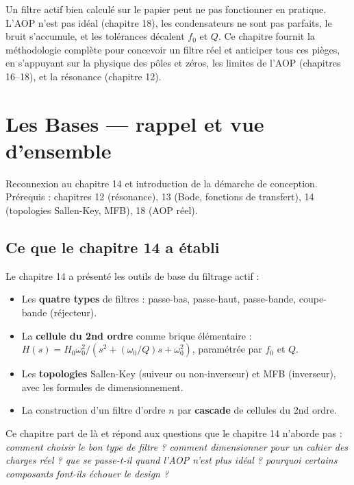 \documentclass[12pt,a4paper,twoside]{book}
\begin{document}
Un filtre actif bien calculé sur le papier peut ne pas fonctionner en pratique. L'AOP n'est pas idéal (chapitre 18), les condensateurs ne sont pas parfaits, le bruit s'accumule, et les tolérances décalent $f_0$ et $Q$. Ce chapitre fournit la méthodologie complète pour concevoir un filtre réel et anticiper tous ces pièges, en s'appuyant sur la physique des pôles et zéros, les limites de l'AOP (chapitres 16--18), et la résonance (chapitre 12).

\section{Les Bases --- rappel et vue d'ensemble}

\begin{bases}
Reconnexion au chapitre 14 et introduction de la démarche de conception. Prérequis : chapitres 12 (résonance), 13 (Bode, fonctions de transfert), 14 (topologies Sallen-Key, MFB), 18 (AOP réel).
\end{bases}

\subsection{Ce que le chapitre 14 a établi}

Le chapitre 14 a présenté les outils de base du filtrage actif :

\begin{itemize}[nosep]
\item Les \textbf{quatre types} de filtres : passe-bas, passe-haut, passe-bande, coupe-bande (réjecteur).
\item La \textbf{cellule du 2nd ordre} comme brique élémentaire : $H(s) = H_0\omega_0^2/(s^2 + (\omega_0/Q)s + \omega_0^2)$, paramétrée par $f_0$ et $Q$.
\item Les \textbf{topologies} Sallen-Key (suiveur ou non-inverseur) et MFB (inverseur), avec les formules de dimensionnement.
\item La construction d'un filtre d'ordre $n$ par \textbf{cascade} de cellules du 2nd ordre.
\end{itemize}

Ce chapitre part de là et répond aux questions que le chapitre 14 n'aborde pas : \textit{comment choisir le bon type de filtre ? comment dimensionner pour un cahier des charges réel ? que se passe-t-il quand l'AOP n'est plus idéal ? pourquoi certains composants font-ils échouer le design ?}
\end{document}
